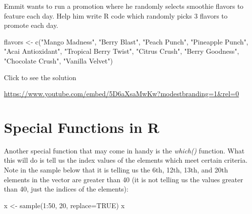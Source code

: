 \documentclass[
  letterpaper,
  DIV=11,
  numbers=noendperiod]{scrreprt}
\newenvironment{Shaded}{\begin{snugshade}}{\end{snugshade}}
\newcommand{\AttributeTok}[1]{\textcolor[rgb]{0.40,0.45,0.13}{#1}}
\newcommand{\ConstantTok}[1]{\textcolor[rgb]{0.56,0.35,0.01}{#1}}
\newcommand{\DecValTok}[1]{\textcolor[rgb]{0.68,0.00,0.00}{#1}}
\newcommand{\FunctionTok}[1]{\textcolor[rgb]{0.28,0.35,0.67}{#1}}
\newcommand{\NormalTok}[1]{\textcolor[rgb]{0.00,0.23,0.31}{#1}}
\newcommand{\OtherTok}[1]{\textcolor[rgb]{0.00,0.23,0.31}{#1}}
\newcommand{\SpecialCharTok}[1]{\textcolor[rgb]{0.37,0.37,0.37}{#1}}
\newcommand{\StringTok}[1]{\textcolor[rgb]{0.13,0.47,0.30}{#1}}
\begin{document}
\begin{tcolorbox}[enhanced jigsaw, colframe=quarto-callout-tip-color-frame, colback=white, breakable, rightrule=.15mm, title=\textcolor{quarto-callout-tip-color}{\faLightbulb}\hspace{0.5em}{Try it Out}, bottomtitle=1mm, toptitle=1mm, titlerule=0mm, left=2mm, coltitle=black, colbacktitle=quarto-callout-tip-color!10!white, leftrule=.75mm, opacitybacktitle=0.6, bottomrule=.15mm, opacityback=0, arc=.35mm, toprule=.15mm]

Emmit wants to run a promotion where he randomly selects smoothie
flavors to feature each day. Help him write R code which randomly picks
3 flavors to promote each day.

\begin{Shaded}
\begin{Highlighting}[]
\NormalTok{flavors }\OtherTok{\textless{}{-}} \FunctionTok{c}\NormalTok{(}\StringTok{"Mango Madness"}\NormalTok{, }\StringTok{"Berry Blast"}\NormalTok{, }\StringTok{"Peach Punch"}\NormalTok{, }\StringTok{"Pineapple Punch"}\NormalTok{, }
             \StringTok{"Acai Antioxidant"}\NormalTok{, }\StringTok{"Tropical Berry Twist"}\NormalTok{, }\StringTok{"Citrus Crush"}\NormalTok{, }
             \StringTok{"Berry Goodness"}\NormalTok{, }\StringTok{"Chocolate Crush"}\NormalTok{, }\StringTok{"Vanilla Velvet"}\NormalTok{)}
\end{Highlighting}
\end{Shaded}

Click to see the solution

\url{https://www.youtube.com/embed/5D6aXsaMwKw?modestbranding=1&rel=0}

\end{tcolorbox}

\section{Special Functions in R}\label{special-functions-in-r}

Another special function that may come in handy is the \emph{which()}
function. What this will do is tell us the index values of the elements
which meet certain criteria. Note in the sample below that it is telling
us the 6th, 12th, 13th, and 20th elements in the vector are greater than
40 (it is not telling us the values greater than 40, just the indices of
the elements):

\begin{Shaded}
\begin{Highlighting}[]
\NormalTok{x }\OtherTok{\textless{}{-}} \FunctionTok{sample}\NormalTok{(}\DecValTok{1}\SpecialCharTok{:}\DecValTok{50}\NormalTok{, }\DecValTok{20}\NormalTok{, }\AttributeTok{replace=}\ConstantTok{TRUE}\NormalTok{)}
\NormalTok{x}
\end{Highlighting}
\end{Shaded}
\end{document}
